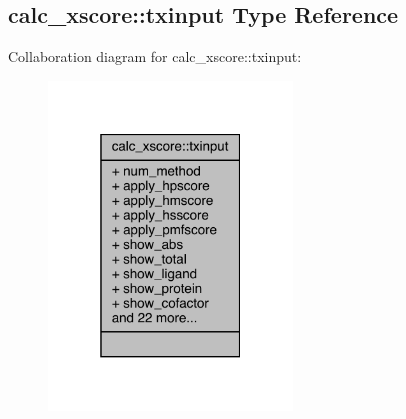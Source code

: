 \hypertarget{structcalc__xscore_1_1txinput}{\subsection{calc\-\_\-xscore\-:\-:txinput Type Reference}
\label{structcalc__xscore_1_1txinput}
}


Collaboration diagram for calc\-\_\-xscore\-:\-:txinput\-:
\nopagebreak
\begin{figure}[H]
\begin{center}
\leavevmode
\includegraphics[width=184pt]{structcalc__xscore_1_1txinput__coll__graph}
\end{center}
\end{figure}
